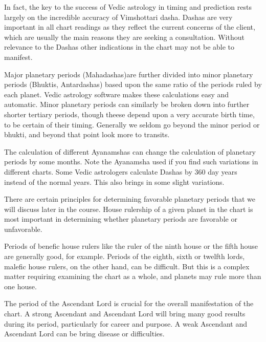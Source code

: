  

In fact, the key to the success of Vedic astrology in timing and prediction rests largely on the incredible accuracy of Vimshottari dasha. Dashas are very important in all chart readings as they reflect the current concerns of the client, which are usually the main reasons they are seeking a consultation. Without relevance to the Dashas other indications in the chart may not be able to manifest.

 

Major planetary periods (Mahadashas)are further divided into minor planetary periods (Bhuktis, Antardashas) based upon the same ratio of the periods ruled by each planet. Vedic astrology software makes these calculations easy and automatic. Minor planetary periods can similarly be broken down into further shorter tertiary periods, though theese depend upon a very accurate birth time, to be certain of their timing. Generally we seldom go beyond the minor period or bhukti, and beyond that point look more to transits.

 

The calculation of different Ayanamshas can change the calculation of planetary periods by some months. Note the Ayanamsha used if you find such variations in different charts. Some Vedic astrologers calculate Dashas by 360 day years instead of the normal years. This also brings in some slight variations.

 

There are certain principles for determining favorable planetary periods that we will discuss later in the course. House rulership of a given planet in the chart is most important in determining whether planetary periods are favorable or unfavorable.

 

Periods of benefic house rulers like the ruler of the ninth house or the fifth house are generally good, for example. Periods of the eighth, sixth or twelfth lords, malefic house rulers, on the other hand, can be difficult. But this is a complex matter requiring examining the chart as a whole, and planets may rule more than one house.

 

The period of the Ascendant Lord is crucial for the overall manifestation of the chart. A strong Ascendant and Ascendant Lord will bring many good results during its period, particularly for career and purpose. A weak Ascendant and Ascendant Lord can be bring disease or difficulties.

